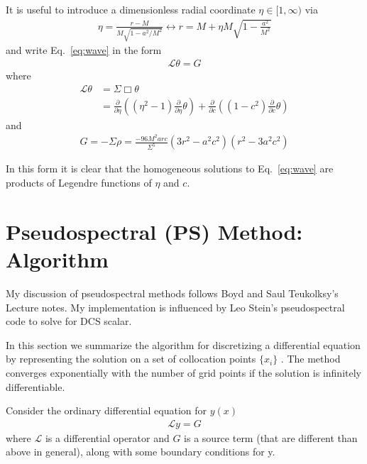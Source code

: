 \documentclass[aps,prd,amsmath,showpacs,amssymb,superscriptaddress,nofootinbib,longbibliography,eqsecnum,preprintnumbers]{revtex4-1}
\begin{document}
It is useful to introduce a dimensionless radial coordinate $\eta \in [1,\infty)$ via
\begin{align}
\eta=\frac{r-M}{M\sqrt{1-a^2/M^2}} \leftrightarrow r=M+\eta M\sqrt{1-\frac{a^2}{M^2}}
\end{align}
and write Eq.~\eqref{eq:wave} in the form
\begin{align}
\mathcal{L}\theta=G
\end{align}
where
\begin{align}
\mathcal{L}\theta&=\Sigma \Box\theta \\
&= \frac{\partial}{\partial \eta}\left((\eta^2-1)\frac{\partial }{\partial \eta}\theta\right) + \frac{\partial}{\partial c}\left((1-c^2) \frac{\partial }{\partial c}\theta\right)
\end{align}
and 
\begin{align}
G=-\Sigma \rho=\frac{-96M^2arc}{\Sigma^5}(3r^2-a^2c^2)(r^2-3a^2c^2)
\end{align}

In this form it is clear that the homogeneous solutions to Eq.~\eqref{eq:wave} are products of Legendre functions of $\eta$ and $c$.

\section{Pseudospectral (PS) Method: Algorithm}
My discussion of pseudospectral methods follows Boyd \cite{Boyd99chebyshevand} and Saul Teukolksy's Lecture notes. My implementation is influenced by Leo Stein's pseudospectral code to solve for DCS scalar.

In this section we summarize the algorithm for discretizing a differential equation by representing the solution on a set of collocation points $\{x_i\}$ . The method converges exponentially with the number of grid points if the solution is infinitely differentiable.

Consider the ordinary differential equation for $y(x)$
\begin{align}
\mathcal{L} y = G \label{eq:ODE}
\end{align}
where $\mathcal L$ is a differential operator and $G$ is a source term (that are different than above in general), along with some boundary conditions for y.
\end{document}
